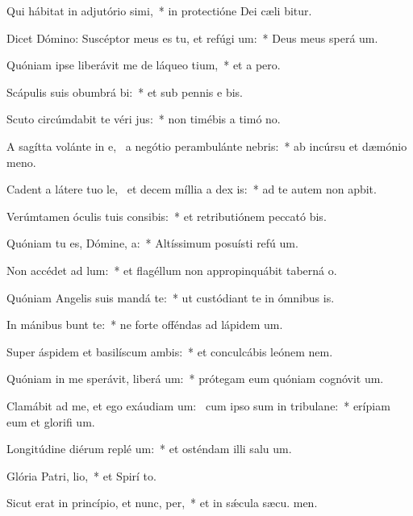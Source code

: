 \item Qui hábitat in adjutório simi,~* in protectióne Dei cæli bitur.
\item Dicet Dómino: Suscéptor meus es tu, et refúgi um:~* Deus meus sperá  um.
\item Quóniam ipse liberávit me de láqueo tium,~* et a  pero.
\item Scápulis suis obumbrá bi:~* et sub pennis e bis.
\item Scuto circúmdabit te véri jus:~* non timébis a timó no.
\item A sagítta volánte in e,~\pscross{} a negótio perambulánte  nebris:~* ab incúrsu et dæmónio meno.
\item Cadent a látere tuo le,~\pscross{} et decem míllia a dex is:~* ad te autem non apbit.
\item Verúmtamen óculis tuis consibis:~* et retributiónem peccató bis.
\item Quóniam tu es, Dómine,  a:~* Altíssimum posuísti refú um.
\item Non accédet ad  lum:~* et flagéllum non appropinquábit taberná o.
\item Quóniam Angelis suis mandá  te:~* ut custódiant te in ómnibus  is.
\item In mánibus bunt te:~* ne forte offéndas ad lápidem  um.
\item Super áspidem et basilíscum ambis:~* et conculcábis leónem  nem.
\item Quóniam in me sperávit, liberá um:~* prótegam eum quóniam cognóvit  um.
\item Clamábit ad me, et ego exáudiam um:~\pscross{} cum ipso sum in tribulane:~* erípiam eum et glorifi um.
\item Longitúdine diérum replé um:~* et osténdam illi salu um.
\item Glória Patri,  lio,~* et Spirí to.
\item Sicut erat in princípio, et nunc,  per,~* et in sǽcula sæcu. men.
